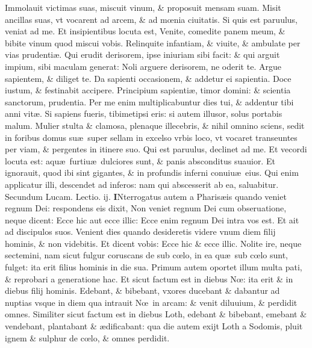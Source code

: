 \documentclass[a5paper,10pt]{book}
\def\leftmarginnote{%
	\lrmarginnote{\hskip -\marginparsep \hskip -6.5em}}
\def\ae{æ}
\def\oe{œ}
\begin{document}
\begin{multicols*}{2}
Immolauit victimas suas, miscuit vinum, \& proposuit mensam suam. Misit ancillas suas, vt vocarent ad arcem, \& ad m\oe nia ciuitatis.
Si quis est paruulus, veniat ad me. Et insipientibus locuta est, Venite, comedite panem meum, \& bibite vinum quod miscui vobis.
Relinquite infantiam, \& viuite, \& ambulate per vias prudenti\ae . Qui erudit derisorem, ipse iniuriam sibi facit: \& qui arguit impium, sibi maculam generat: Noli arguere derisorem, ne oderit te. Argue sapientem, \& diliget te.
Da sapienti occasionem, \& addetur ei sapientia. Doce iustum, \& festinabit accipere. Principium sapienti\ae , timor domini: \& scientia sanctorum, prudentia.
Per me enim multiplicabuntur dies tui, \& addentur tibi anni vit\ae . Si sapiens fueris, tibimetipsi eris: si autem illusor, solus portabis malum.
Mulier stulta \& clamosa, plenaque illecebris, \& nihil omnino sciens, sedit in foribus domus su\ae \ super sellam in excelso vrbis loco, vt vocaret transeuntes per viam, \& pergentes in itinere suo.
Qui est paruulus, declinet ad me. Et vecordi locuta est: aqu\ae \ furtiu\ae \ dulciores sunt, \& panis absconditus suauior.
Et ignorauit, quod ibi sint gigantes, \& in profundis inferni conuiu\ae \ eius.
Qui enim applicatur illi, descendet ad inferos: nam qui abscesserit ab ea, saluabitur.%
\fancyhead[C]{\color{red} Feria. vj. Dominic\ae . ij. post aduentum}
\newline \color{red} Secundum Lucam. \hfill Lectio. ij. \color{black}
\vspace{-.25em}
\lettrine[lines=2]{\bfseries \color{red} I}{}Nterrogatus\leftmarginnote{\begin{flushright}c. 17.\end{flushright}} autem a Pharis\ae is quando veniet regnum Dei: respondens eis dixit, Non veniet regnum Dei cum obseruatione, neque dicent: Ecce hic aut ecce illic: Ecce enim regnum Dei intra vos est.
Et ait ad discipulos suos. Venient dies quando desideretis videre vnum diem filij hominis, \& non videbitis. Et dicent vobis: Ecce hic \& ecce illic.
Nolite ire, neque sectemini, nam sicut fulgur coruscans de sub c\oe lo, in ea qu\ae \ sub c\oe lo sunt, fulget: ita erit filius hominis in die sua.
Primum autem oportet illum multa pati, \& reprobari a generatione hac.
Et sicut factum est in diebus N\oe : ita erit \& in diebus filij hominis. Edebant,
\& bibebant, vxores ducebant \& dabantur ad nuptias vsque in diem qua intrauit N\oe \ in arcam: \& venit diluuium, \& perdidit omnes.
Similiter sicut factum est in diebus Loth, edebant \& bibebant, emebant \& vendebant, plantabant \& \ae dificabant: qua die autem exijt Loth a Sodomis, pluit ignem \& sulphur de c\oe lo, \& omnes perdidit.

\end{multicols*}
\end{document}
